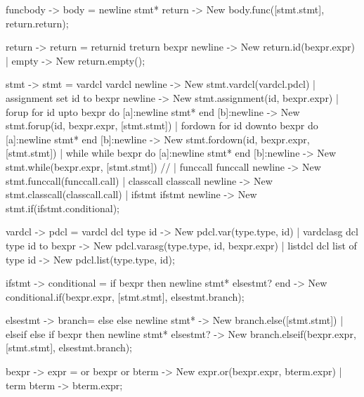     funcbody    {-> body}   =   newline stmt* return                                    {-> New body.func([stmt.stmt], return.return)};

    return      {-> return} =   {returnid} treturn bexpr newline                        {-> New return.id(bexpr.expr)}
                            |   {empty}                                                 {-> New return.empty()};


    stmt        {-> stmt}   =   {vardcl} vardcl newline                                        {-> New stmt.vardcl(vardcl.pdcl)}
                            |   {assignment} set id to bexpr newline                           {-> New stmt.assignment(id, bexpr.expr)}
                            |   {forup} for id upto bexpr do [a]:newline stmt* end [b]:newline         {-> New stmt.forup(id, bexpr.expr, [stmt.stmt])}
                            |   {fordown} for id downto bexpr do [a]:newline stmt* end [b]:newline     {-> New stmt.fordown(id, bexpr.expr, [stmt.stmt])}
                            |   {while} while bexpr do [a]:newline stmt* end [b]:newline               {-> New stmt.while(bexpr.expr, [stmt.stmt])}
                         //   |   {funccall} funccall newline                                    {-> New stmt.funccall(funccall.call)}
                            |   {classcall} classcall newline                                  {-> New stmt.classcall(classcall.call)}
                            |   {ifstmt} ifstmt newline                                        {-> New stmt.if(ifstmt.conditional)};

    vardcl      {-> pdcl}   =   {vardcl} dcl type id                                    {-> New pdcl.var(type.type, id)}
                            |   {vardclasg} dcl type id to bexpr                        {-> New pdcl.varasg(type.type, id, bexpr.expr)}
                            |   {listdcl} dcl list of type id                           {-> New pdcl.list(type.type, id)};

    ifstmt      {-> conditional} =   if bexpr then newline stmt* elsestmt? end               {-> New conditional.if(bexpr.expr, [stmt.stmt], elsestmt.branch)};

    elsestmt    {-> branch}=   {else} else newline stmt*                              {-> New branch.else([stmt.stmt])}
                             |   {elseif} else if bexpr then newline stmt* elsestmt?    {-> New branch.elseif(bexpr.expr, [stmt.stmt], elsestmt.branch)};


    bexpr       {-> expr}   =   {or} bexpr or bterm                                     {-> New expr.or(bexpr.expr, bterm.expr)}
                            |   {term} bterm                                            {-> bterm.expr};

